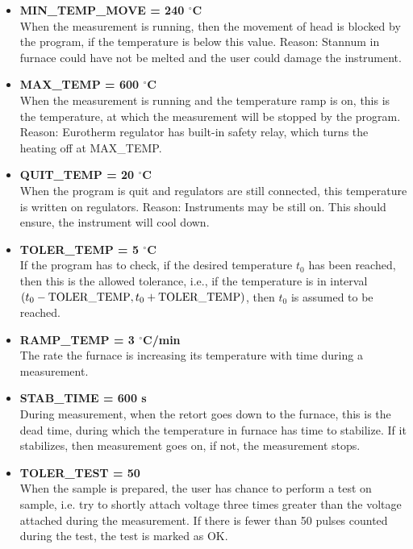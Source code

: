 \documentclass[a4paper,11pt,twoside]{book}
\theoremstyle{named}
\begin{document}
\begin{itemize}
  \item \textbf{MIN\_TEMP\_MOVE = 240 $^{\circ}$C} \\
    When the measurement is running, then the movement of head is blocked by the
    program, if the temperature is below this value. Reason: Stannum in furnace
    could have not be melted and the user could damage the instrument.  
  \item \textbf{MAX\_TEMP = 600 $^{\circ}$C} \\
    When the measurement is running and the temperature ramp is on, this is the
    temperature, at which the measurement will be stopped by the program.
    Reason: Eurotherm regulator has built-in safety relay, which turns the
    heating off at MAX\_TEMP.
  \item \textbf{QUIT\_TEMP = 20 $^{\circ}$C} \\
    When the program is quit and regulators are still connected, this
    temperature is written on regulators. Reason: Instruments may be still on.
    This should ensure, the instrument will cool down.
  \item \textbf{TOLER\_TEMP = 5 $^{\circ}$C} \\
    If the program has to check, if the desired temperature $t_0$ has been
    reached, then this is the allowed tolerance, i.e., if the temperature is in
    interval $(t_0 - {\rm TOLER\_TEMP}, t_0 + {\rm TOLER\_TEMP})$, then 
    $t_0$ is assumed to be reached.  
  \item \textbf{RAMP\_TEMP = 3 $^{\circ}$C/min} \\
    The rate the furnace is increasing its temperature with time during a
    measurement.
  \item \textbf{STAB\_TIME = 600 s} \\
    During measurement, when the retort goes down to the furnace, this is the
    dead time, during which the temperature in furnace has time to stabilize. If it
    stabilizes, then measurement goes on, if not, the measurement stops. 
  \item \textbf{TOLER\_TEST = 50} \\
    When the sample is prepared, the user has chance to perform a test on
    sample, i.e. try to shortly attach voltage three times greater than the voltage
    attached during the measurement. If there is fewer than 50 pulses counted
    during the test, the test is marked as OK.
\end{itemize}
\end{document}
